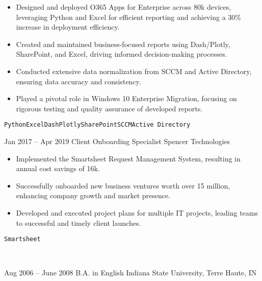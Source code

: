 \documentclass[9pt]{developercv} %
\renewcommand{\cvsect}[1]{%
    \vspace{\baselineskip} %
    \colorbox{primary}{\textcolor{white}{\MakeUppercase{\textbf{#1}}}}\\%
}
\begin{document}
\begin{entrylist}
{\begin{itemize}
            \item Designed and deployed O365 Apps for Enterprise across 80k devices, leveraging Python and Excel for efficient reporting and achieving a 30\% increase in deployment efficiency.
            \item Created and maintained business-focused reports using Dash/Plotly, SharePoint, and Excel, driving informed decision-making processes.
            \item Conducted extensive data normalization from SCCM and Active Directory, ensuring data accuracy and consistency.
            \item Played a pivotal role in Windows 10 Enterprise Migration, focusing on rigorous testing and quality assurance of developed reports.
        \end{itemize}
        \texttt{Python}\slashsep\texttt{Excel}\slashsep\texttt{Dash}\slashsep\texttt{Plotly}\slashsep\texttt{SharePoint}\slashsep\texttt{SCCM}\slashsep\texttt{Active Directory}
        }
    \entry
        {Jan 2017 -- Apr 2019}
        { Client Onboarding Specialist}
        {Spencer Technologies}
        {
        \begin{itemize}
            \item Implemented the Smartsheet Request Management System, resulting in annual cost savings of 16k.
            \item Successfully onboarded new business ventures worth over 15 million, enhancing company growth and market presence.
            \item Developed and executed project plans for multiple IT projects, leading teams to successful and timely client launches.
        \end{itemize}
        \texttt{Smartsheet}
        }
\end{entrylist}


\cvsect{Education}

\begin{entrylist}
    \entry
        {Aug 2006 -- June 2008}
        { B.A. in English}
        {Indiana State University, Terre Haute, IN}
        {}
\end{entrylist}

\end{document}
